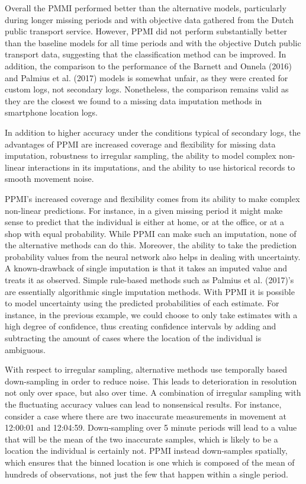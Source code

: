 \documentclass[man]{apa6}
\theoremstyle{definition}
\theoremstyle{definition}
\theoremstyle{definition}
\theoremstyle{remark}
\begin{document}
Overall the PMMI performed better than the alternative models,
particularly during longer missing periods and with objective data
gathered from the Dutch public transport service. However, PPMI did not
perform substantially better than the baseline models for all time
periods and with the objective Dutch public transport data, suggesting
that the classification method can be improved. In addition, the
comparison to the performance of the Barnett and Onnela (2016) and
Palmius et al. (2017) models is somewhat unfair, as they were created
for custom logs, not secondary logs. Nonetheless, the comparison remains
valid as they are the closest we found to a missing data imputation
methods in smartphone location logs.

In addition to higher accuracy under the conditions typical of secondary
logs, the advantages of PPMI are increased coverage and flexibility for
missing data imputation, robustness to irregular sampling, the ability
to model complex non-linear interactions in its imputations, and the
ability to use historical records to smooth movement noise.

PPMI's increased coverage and flexibility comes from its ability to make
complex non-linear predictions. For instance, in a given missing period
it might make sense to predict that the individual is either at home, or
at the office, or at a shop with equal probability. While PPMI can make
such an imputation, none of the alternative methods can do this.
Moreover, the ability to take the prediction probability values from the
neural network also helps in dealing with uncertainty. A known-drawback
of single imputation is that it takes an imputed value and treats it as
observed. Simple rule-based methods such as Palmius et al. (2017)'s are
essentially algorithmic single imputation methods. With PPMI it is
possible to model uncertainty using the predicted probabilities of each
estimate. For instance, in the previous example, we could choose to only
take estimates with a high degree of confidence, thus creating
confidence intervals by adding and subtracting the amount of cases where
the location of the individual is ambiguous.

With respect to irregular sampling, alternative methods use temporally
based down-sampling in order to reduce noise. This leads to
deterioration in resolution not only over space, but also over time. A
combination of irregular sampling with the fluctuating accuracy values
can lead to nonsensical results. For instance, consider a case where
there are two inaccurate measurements in movement at 12:00:01 and
12:04:59. Down-sampling over 5 minute periods will lead to a value that
will be the mean of the two inaccurate samples, which is likely to be a
location the individual is certainly not. PPMI instead down-samples
spatially, which ensures that the binned location is one which is
composed of the mean of hundreds of observations, not just the few that
happen within a single period.
\end{document}
